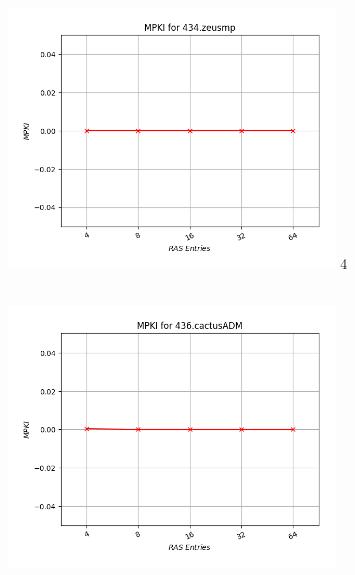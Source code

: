    \begin{minipage}{\textwidth}
      \begin{center}
         \\
         \vspace{3mm}
         \includegraphics[width=0.65\textwidth, frame]{./graphs/4-4/434-zeusmp.png}
         \vspace{6mm}4
      \end{center}
   \end{minipage}

   \begin{minipage}{\textwidth}
      \begin{center}
         \\
         \vspace{3mm}
         \includegraphics[width=0.65\textwidth, frame]{./graphs/4-4/436-cactusADM.png}
         \vspace{6mm}
      \end{center}
   \end{minipage}

